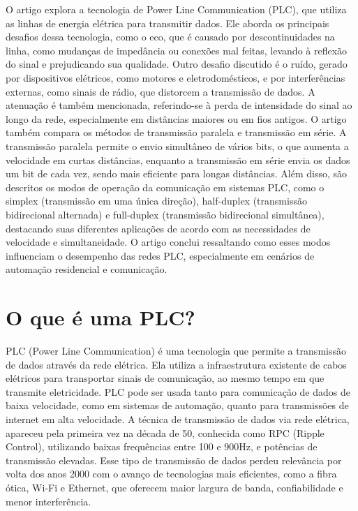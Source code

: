 \documentclass[12pt]{article}
\begin{document}
\begin{resumo} 
O artigo explora a tecnologia de Power Line Communication (PLC), que utiliza as linhas de energia elétrica para transmitir dados. Ele aborda os principais desafios dessa tecnologia, como o eco, que é causado por descontinuidades na linha, como mudanças de impedância ou conexões mal feitas, levando à reflexão do sinal e prejudicando sua qualidade. Outro desafio discutido é o ruído, gerado por dispositivos elétricos, como motores e eletrodomésticos, e por interferências externas, como sinais de rádio, que distorcem a transmissão de dados. A atenuação é também mencionada, referindo-se à perda de intensidade do sinal ao longo da rede, especialmente em distâncias maiores ou em fios antigos. O artigo também compara os métodos de transmissão paralela e transmissão em série. A transmissão paralela permite o envio simultâneo de vários bits, o que aumenta a velocidade em curtas distâncias, enquanto a transmissão em série envia os dados um bit de cada vez, sendo mais eficiente para longas distâncias. Além disso, são descritos os modos de operação da comunicação em sistemas PLC, como o simplex (transmissão em uma única direção), half-duplex (transmissão bidirecional alternada) e full-duplex (transmissão bidirecional simultânea), destacando suas diferentes aplicações de acordo com as necessidades de velocidade e simultaneidade. O artigo conclui ressaltando como esses modos influenciam o desempenho das redes PLC, especialmente em cenários de automação residencial e comunicação.
\end{resumo}

\tableofcontents

\section{O que é uma PLC?} \label{sec:firstpage}

PLC (Power Line Communication) é uma tecnologia que permite a transmissão de dados através da rede elétrica. Ela utiliza a infraestrutura existente de cabos elétricos para transportar sinais de comunicação, ao mesmo tempo em que transmite eletricidade. PLC pode ser usada tanto para comunicação de dados de baixa velocidade, como em sistemas de automação, quanto para transmissões de internet em alta velocidade. A técnica de transmissão de dados via rede elétrica, apareceu pela primeira vez na década de 50, conhecida como RPC (Ripple Control), utilizando baixas frequências entre 100 e 900Hz, e potências de transmissão elevadas. Esse tipo de transmissão de dados perdeu relevância por volta dos anos 2000 com o avanço de tecnologias mais eficientes, como a fibra ótica, Wi-Fi e Ethernet, que oferecem maior largura de banda, confiabilidade e menor interferência. \cite{lopes2021}
\end{document}

